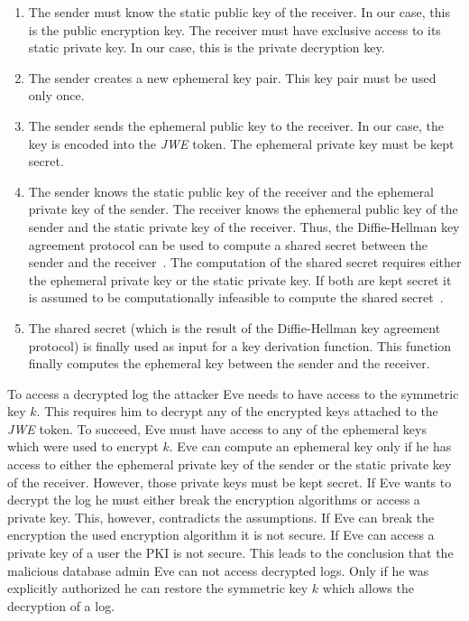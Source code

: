 \documentclass[../main.tex]{subfiles}
\begin{document}
\begin{enumerate}
    \item 
    The sender must know the static public key of the receiver. 
    In our case, this is the public encryption key.
    The receiver must have exclusive access to its static private key.
    In our case, this is the private decryption key.
    \item 
    The sender creates a new ephemeral key pair. 
    This key pair must be used only once.
    \item 
    The sender sends the ephemeral public key to the receiver.
    In our case, the key is encoded into the \emph{JWE} token.
    The ephemeral private key must be kept secret.
    \item 
    The sender knows the static public key of the receiver and the ephemeral private key of the sender.
    The receiver knows the ephemeral public key of the sender and the static private key of the receiver.
    Thus, the Diffie-Hellman key agreement protocol can be used to compute a shared secret between the sender and the receiver~\cite[section 9.3.6]{Eckert2018}.
    The computation of the shared secret requires either the ephemeral private key or the static private key.
    If both are kept secret it is assumed to be computationally infeasible to compute the shared secret~\cite[section 9.3.6]{Eckert2018}.
    \item 
    The shared secret (which is the result of the Diffie-Hellman key agreement protocol) is finally used as input for a key derivation function.
    This function finally computes the ephemeral key between the sender and the receiver.
\end{enumerate}

To access a decrypted log the attacker Eve needs to have access to the symmetric key $k$.
This requires him to decrypt any of the encrypted keys attached to the \emph{JWE} token.
To succeed, Eve must have access to any of the ephemeral keys which were used to encrypt $k$.
Eve can compute an ephemeral key only if he has access to either the ephemeral private key of the sender or the static private key of the receiver.
However, those private keys must be kept secret.
If Eve wants to decrypt the log he must either break the encryption algorithms or access a private key.
This, however, contradicts the assumptions.
If Eve can break the encryption the used encryption algorithm it is not secure.
If Eve can access a private key of a user the PKI is not secure.
This leads to the conclusion that the malicious database admin Eve can not access decrypted logs.
Only if he was explicitly authorized he can restore the symmetric key $k$ which allows the decryption of a log.
\end{document}

